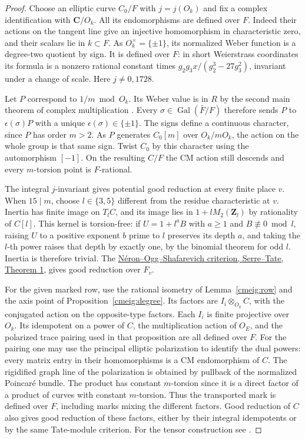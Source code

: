 \begin{proof}
Choose an elliptic curve \(C_0/F\) with \(j=j(O_k)\) and fix a complex
identification with \(\mathbf C/O_k\). All its endomorphisms are
defined over \(F\). Indeed their actions on the tangent line give an
injective homomorphism in characteristic zero, and their scalars lie
in \(k\subset F\). As \(O_k^\times=\{\pm1\}\), its normalized Weber
function is a degree-two quotient by sign. It is defined over \(F\):
in short Weierstrass coordinates its formula is a nonzero rational
constant times \(g_2g_3 x/(g_2^3-27g_3^2)\), invariant under a
change of scale. Here \(j\ne0,1728\).

Let \(P\) correspond to \(1/m\bmod O_k\). Its Weber value is in
\(R\) by the second main theorem of complex multiplication
\cite[Theorem 11.39]{coxCM}. Every \(\sigma\in\operatorname{Gal}(\bar F/F)\)
therefore sends \(P\) to \(\epsilon(\sigma)P\) with a unique
\(\epsilon(\sigma)\in\{\pm1\}\). The signs define a continuous
character, since \(P\) has order \(m>2\). As \(P\) generates
\(C_0[m]\) over \(O_k/mO_k\), the action on the whole group is that
same sign. Twist \(C_0\) by this character using the automorphism
\([-1]\). On the resulting \(C/F\) the CM action still descends and
every \(m\)-torsion point is \(F\)-rational.

The integral \(j\)-invariant gives potential good reduction at every
finite place \(v\). When \(15\mid m\), choose \(l\in\{3,5\}\)
different from the residue characteristic at \(v\). Inertia has finite
image on \(T_lC\), and its image lies in \(1+lM_2(\mathbf Z_l)\)
by rationality of \(C[l]\). This kernel is torsion-free: if
\(U=1+l^aB\) with \(a\ge1\) and \(B\not\equiv0\bmod l\),
raising \(U\) to a positive exponent \(b\) prime to \(l\) preserves
its depth \(a\), and taking the \(l\)-th power raises that depth
by exactly one, by the binomial theorem for odd \(l\).
Inertia is therefore trivial. The
\href{https://wstein.org/papers/bib/Serre-Tate-Good_Reduction_of_Abelian_Varieties.pdf}
{N\'eron--Ogg--Shafarevich criterion, Serre--Tate, Theorem 1},
gives good reduction over \(F_v\).

For the given marked row, use the rational isometry of
Lemma~\ref{cmeig:row} and the axis point of
Proposition~\ref{cmeig:degree}. Its factors are
\(I_i\otimes_{O_k} C\), with the conjugated action on the
opposite-type factors. Each \(I_i\) is finite projective over
\(O_k\). Its idempotent on a power of \(C\), the multiplication
action of \(O_E\), and the polarized trace pairing used in that
proposition are all defined over \(F\). For the pairing one may
use the principal elliptic polarization to identify the dual
powers: every matrix entry in their homomorphisms is a CM
endomorphism of \(C\). The rigidified graph line of the polarization
is obtained by pullback of the normalized Poincar\'e bundle.
The product has constant \(m\)-torsion since it is a direct factor
of a product of curves with constant \(m\)-torsion. Thus the
transported mark is defined over \(F\), including marks mixing
the different factors. Good reduction of \(C\) also gives good
reduction of these factors, either by their integral idempotents
or by the same Tate-module criterion. For the tensor construction
see \cite[\S2]{serreTensor}.


\end{proof}

